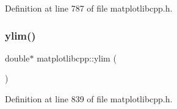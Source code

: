 Definition at line 787 of file matplotlibcpp.\+h.

\mbox{\label{namespacematplotlibcpp_a2bbe226f1dee9763197d9ab7692f4dc7}} 
\subsubsection{\texorpdfstring{ylim()}{ylim()}\hspace{0.1cm}{\footnotesize\ttfamily [2/2]}}
{\footnotesize\ttfamily double$\ast$ matplotlibcpp\+::ylim (\begin{DoxyParamCaption}{ }\end{DoxyParamCaption})\hspace{0.3cm}{\ttfamily [inline]}}



Definition at line 839 of file matplotlibcpp.\+h.

